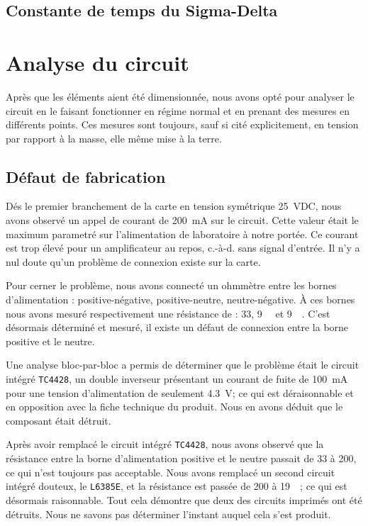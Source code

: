 \documentclass[10pt, oneside, a4paper]{article}
\begin{document}
\subsection{Constante de temps du Sigma-Delta}

\section{Analyse du circuit}
Après que les éléments aient été dimensionnée, nous avons opté pour analyser le circuit en le faisant fonctionner en régime normal et en prenant des mesures en différents points.
Ces mesures sont toujours, sauf si cité explicitement, en tension par rapport à la masse, elle même mise à la terre.

\subsection{Défaut de fabrication}
Dés le premier branchement de la carte en tension symétrique \pm\SI{25}{\volt}DC,
nous avons observé un appel de courant de \SI{200}{\milli\ampere} sur le circuit.
Cette valeur était le maximum parametré sur l'alimentation de laboratoire à notre portée.
Ce courant est trop élevé pour un amplificateur au repos, c.-à-d. sans signal d'entrée.
Il n'y a nul doute qu'un problème de connexion existe sur la carte.

Pour cerner le problème, nous avons connecté un ohmmètre entre les bornes d'alimentation : positive-négative, positive-neutre, neutre-négative.
À ces bornes nous avons mesuré respectivement une résistance de : \SI{33}{\Omega}, \SI{9}{\kilo\Omega} et \SI{9}{\kilo\Omega}.
C'est désormais déterminé et mesuré, il existe un défaut de connexion entre la borne positive et le neutre.

Une analyse bloc-par-bloc a permis de déterminer que le problème était le circuit intégré \verb|TC4428|, un double inverseur présentant un courant de fuite de \SI{100}{\milli\ampere} pour une tension d'alimentation de seulement \SI{4.3}{\volt};
ce qui est déraisonnable et en opposition avec la fiche technique du produit.
Nous en avons déduit que le composant était détruit.

Après avoir remplacé le circuit intégré \verb|TC4428|, nous avons observé que la résistance entre la borne d'alimentation positive et le neutre passait de \SI{33}{\Omega} à \SI{200}{\Omega}, ce qui n'est toujours pas acceptable.
Nous avons remplacé un second circuit intégré douteux, le \verb|L6385E|, et la résistance est passée de \SI{200}{\Omega} à \SI{19}{\kilo\Omega}; ce qui est désormais raisonnable.
Tout cela démontre que deux des circuits imprimés ont été détruits.
Nous ne savons pas déterminer l'instant auquel cela s'est produit.
\end{document}
